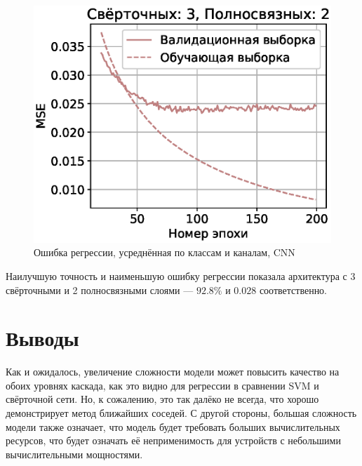 \documentclass[12pt,twoside]{article}
\begin{document}
\begin{figure}[H]
    \includegraphics[scale=0.44]{charts/cnn32_mse.eps}
    \centering
    \caption{Ошибка регрессии, усреднённая по классам и каналам, CNN}
\end{figure}

Наилучшую точность и наименьшую ошибку регрессии показала архитектура с 3 свёрточными и 2 полносвязными слоями --- $92.8\%$ и $0.028$ соответственно.

\section{Выводы}

Как и ожидалось, увеличение сложности модели может повысить качество на обоих уровнях каскада, как это видно для регрессии в сравнении SVM и свёрточной сети. Но, к сожалению, это так далёко не всегда, что хорошо демонстрирует метод ближайших соседей. С другой стороны, большая сложность модели также означает, что модель будет требовать больших вычислительных ресурсов, что будет означать её неприменимость для устройств с небольшими вычислительными мощностями.

\nocite{*}


\end{document}
